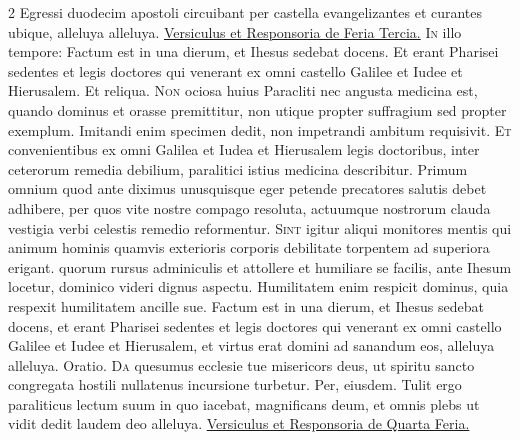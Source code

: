 \begin{multicols*}{2}
 Egressi duodecim apostoli circuibant per castella evangelizantes et curantes ubique, alleluya alleluya.
 \ul{Versiculus et Responsoria de Feria Tercia.}
\lettrine[lines=2]{\zallmancaps \color{Blue} I}{n} illo tempore: Factum est in una dierum, et Ihesus sedebat docens. Et erant Pharisei sedentes et legis doctores qui venerant ex omni castello Galilee et Iudee et Hierusalem. Et reliqua.
\lettrine[lines=2]{\zallmancaps \color{Red} N}{on} ociosa huius Paracliti nec angusta medicina est, quando dominus et orasse premittitur, non utique propter suffragium sed propter exemplum. Imitandi enim specimen dedit, non impetrandi ambitum requisivit.
\lettrine[lines=2]{\zallmancaps \color{Blue} E}{t} convenientibus ex omni Galilea et Iudea et Hierusalem legis doctoribus, inter ceterorum remedia debilium, paralitici istius medicina describitur. Primum omnium quod ante diximus unusquisque eger petende precatores salutis debet adhibere, per quos vite nostre compago resoluta, actuumque nostrorum clauda vestigia verbi celestis remedio reformentur.
\lettrine[lines=2]{\zallmancaps \color{Red} S}{int} igitur aliqui monitores mentis qui animum hominis quamvis exterioris corporis debilitate torpentem ad superiora erigant. quorum rursus adminiculis et attollere et humiliare se facilis, ante Ihesum locetur, dominico videri dignus aspectu. Humilitatem enim respicit dominus, quia respexit humilitatem ancille sue.
 Factum est in una dierum, et Ihesus sedebat docens, et erant Pharisei sedentes et legis doctores qui venerant ex omni castello Galilee et Iudee et Hierusalem, et virtus erat domini ad sanandum eos, alleluya alleluya. {\color{Red} Oratio.}
\lettrine[lines=2]{\zallmancaps \color{Blue} D}{a} quesumus ecclesie tue misericors deus, ut spiritu sancto congregata hostili nullatenus incursione turbetur. Per, eiusdem.
 Tulit ergo paraliticus lectum suum in quo iacebat, magnificans deum, et omnis plebs ut vidit dedit laudem deo alleluya.
 \ul{Versiculus et Responsoria de Quarta Feria.}

\end{multicols*}
